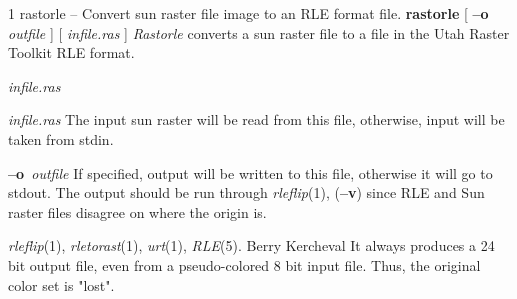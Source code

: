 %
%
%
 1
rastorle -- Convert sun raster file image to an RLE format file.
{\bf rastorle}
[
{\bf --o}
{\it outfile}
] [ 
{\it infile.ras}
] 
{\it Rastorle}
converts a sun raster file to a file in the
Utah Raster Toolkit RLE format.
\begin{TPlist}{{\it infile.ras}}
\item[{{\it infile.ras}}]
The input sun raster will be read from this file, otherwise, input will
be taken from stdin.
\item[{{\bf --o}{\it \ outfile}
}]
If specified, output will be written to this file, otherwise it will
go to stdout.  The output should be run through 
{\it rleflip}{\rm (1),}
{\rm (}{\bf --v}{\rm )}
since RLE and Sun raster files disagree on where the origin is.
\end{TPlist}
{\it rleflip}{\rm (1),}
{\it rletorast}{\rm (1),}
{\it urt}{\rm (1),}
{\it RLE}{\rm (5).}
Berry Kercheval
It always produces a 24 bit output file, even from a pseudo-colored 8
bit input file.  Thus, the original color set is "lost".
\newpage


